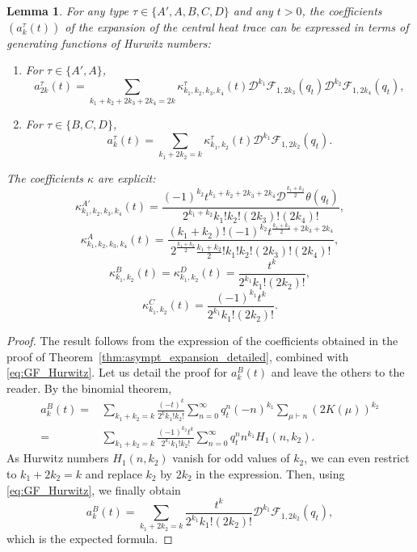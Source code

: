 \documentclass[11pt,a4paper,reqno]{article}
\newtheorem{lemma}[theorem]{Lemma}
\theoremstyle{definition}
\theoremstyle{remark}
\begin{document}
\begin{lemma}\label{lem:coef_Hurwitz}
For any type $\tau\in\{A',A,B,C,D\}$ and any $t>0$, the coefficients $(a_k^\tau(t))$ of the expansion of the central heat trace can be expressed in terms of generating functions of Hurwitz numbers:
\begin{enumerate}
\item For $\tau\in\{A',A\}$,
\begin{equation}
a_{2k}^{\tau}(t) = \sum_{k_1+k_2+2k_3+2k_4=2k} \kappa_{k_1,k_2,k_3,k_4}^{\tau}(t)\mathcal{D}^{k_1}\mathcal{F}_{1,2k_3}(q_t)\mathcal{D}^{k_2}\mathcal{F}_{1,2k_4}(q_t),
\end{equation}
\item For $\tau\in\{B,C,D\}$,
\begin{equation}
a_k^\tau(t)=\sum_{k_1+2k_2=k}\kappa_{k_1,k_2}^\tau(t)\mathcal{D}^{k_1}\mathcal{F}_{1,2k_2}(q_t).
\end{equation}
\end{enumerate}
The coefficients $\kappa$ are explicit:
\begin{equation}
\kappa_{k_1,k_2,k_3,k_4}^{A'}(t)= \frac{(-1)^{k_2}t^{k_1+k_2+2k_3+2k_4}\mathcal{D}^{\frac{k_1+k_2}{2}}\theta(q_t)}{2^{k_1+k_2}k_1!k_2!(2k_3)!(2k_4)!},
\end{equation}
\begin{equation}
\kappa_{k_1,k_2,k_3,k_4}^A(t)= \frac{(k_1+k_2)!(-1)^{k_2}t^{\frac{k_1+k_2}{2}+2k_3+2k_4}}{2^{\frac{k_1+k_2}{2}}\frac{k_1+k_2}{2}!k_1!k_2!(2k_3)!(2k_4)!},
\end{equation}
\begin{equation}
\kappa_{k_1,k_2}^B(t) = \kappa_{k_1,k_2}^D(t) =  \frac{t^k}{2^{k_1}k_1!(2k_2)!},
\end{equation}
\begin{equation}
\kappa_{k_1,k_2}^C(t) = \frac{(-1)^{k_1}t^k}{2^{k_1}k_1!(2k_2)!}.
\end{equation}
\end{lemma}

\begin{proof}
The result follows from the expression of the coefficients obtained in the proof of Theorem~\ref{thm:asympt_expansion_detailed}, combined with \eqref{eq:GF_Hurwitz}. Let us detail the proof for $a_k^B(t)$ and leave the others to the reader. By the binomial theorem,
\begin{align*}
a_k^B(t)= & \sum_{k_1+k_2=k}\frac{(-t)^{k}}{2^kk_1!k_2!}\sum_{n=0}^\infty q_t^n(-n)^{k_1}\sum_{\mu\vdash n}(2K(\mu))^{k_2}\\
= & \sum_{k_1+k_2=k}\frac{(-1)^{k_2}t^{k}}{2^{k_1}k_1!k_2!}\sum_{n=0}^\infty q_t^n n^{k_1}H_1(n,k_2).
\end{align*}
As Hurwitz numbers $H_1(n,k_2)$ vanish for odd values of $k_2$, we can even restrict to $k_1+2k_2=k$ and replace $k_2$ by $2k_2$ in the expression. Then, using \eqref{eq:GF_Hurwitz}, we finally obtain
\[
a_k^B(t)= \sum_{k_1+2k_2=k}\frac{t^{k}}{2^{k_1}k_1!(2k_2)!}\mathcal{D}^{k_1}\mathcal{F}_{1,2k_2}(q_t),
\]
which is the expected formula.
\end{proof}
\end{document}

